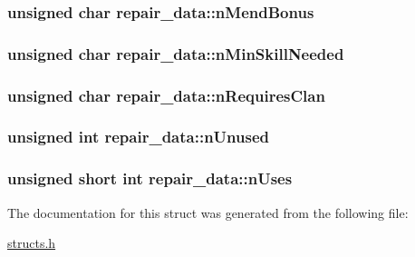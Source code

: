 \hypertarget{structrepair__data_a27d05ca35c7f078dbf88614de0c61b23}{
\subsubsection[{n\-Mend\-Bonus}]{\setlength{\rightskip}{0pt plus 5cm}unsigned char repair\-\_\-data\-::n\-Mend\-Bonus}}\label{structrepair__data_a27d05ca35c7f078dbf88614de0c61b23}
\hypertarget{structrepair__data_ad636f0948e248bda6414c21ae873f7f6}{
\subsubsection[{n\-Min\-Skill\-Needed}]{\setlength{\rightskip}{0pt plus 5cm}unsigned char repair\-\_\-data\-::n\-Min\-Skill\-Needed}}\label{structrepair__data_ad636f0948e248bda6414c21ae873f7f6}
\hypertarget{structrepair__data_ad0cbc9f8bb473c514fc096d350fce8cd}{
\subsubsection[{n\-Requires\-Clan}]{\setlength{\rightskip}{0pt plus 5cm}unsigned char repair\-\_\-data\-::n\-Requires\-Clan}}\label{structrepair__data_ad0cbc9f8bb473c514fc096d350fce8cd}
\hypertarget{structrepair__data_a4529eaf745909e45171be3ba70399528}{
\subsubsection[{n\-Unused}]{\setlength{\rightskip}{0pt plus 5cm}unsigned int repair\-\_\-data\-::n\-Unused}}\label{structrepair__data_a4529eaf745909e45171be3ba70399528}
\hypertarget{structrepair__data_aeb708e14f1dc18f87b9ad3d8d76af2b1}{
\subsubsection[{n\-Uses}]{\setlength{\rightskip}{0pt plus 5cm}unsigned short int repair\-\_\-data\-::n\-Uses}}\label{structrepair__data_aeb708e14f1dc18f87b9ad3d8d76af2b1}


The documentation for this struct was generated from the following file\-:\begin{DoxyCompactItemize}
\item 
\hyperlink{structs_8h}{structs.\-h}\end{DoxyCompactItemize}
